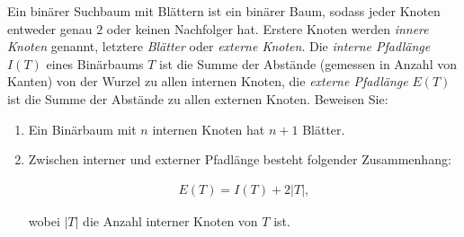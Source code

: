 
\begin{exercise}

Ein binärer Suchbaum mit Blättern ist ein binärer Baum, sodass jeder Knoten entweder genau $2$ oder keinen Nachfolger hat.
Erstere Knoten werden \textit{innere Knoten} genannt, letztere \textit{Blätter} oder \textit{externe Knoten}.
Die \textit{interne Pfadlänge} $I(T)$ eines Binärbaums $T$ ist die Summe der Abstände (gemessen in Anzahl von Kanten) von der Wurzel zu allen internen Knoten, die \textit{externe Pfadlänge} $E(T)$ ist die Summe der Abstände zu allen externen Knoten.
Beweisen Sie:

\begin{enumerate}[label = \alph*)]

    \item Ein Binärbaum mit $n$ internen Knoten hat $n + 1$ Blätter.

    \item Zwischen interner und externer Pfadlänge besteht folgender Zusammenhang:

    \begin{align*}
        E(T) = I(T) + 2 |T|,
    \end{align*}

    wobei $|T|$ die Anzahl interner Knoten von $T$ ist.

\end{enumerate}

\end{exercise}


